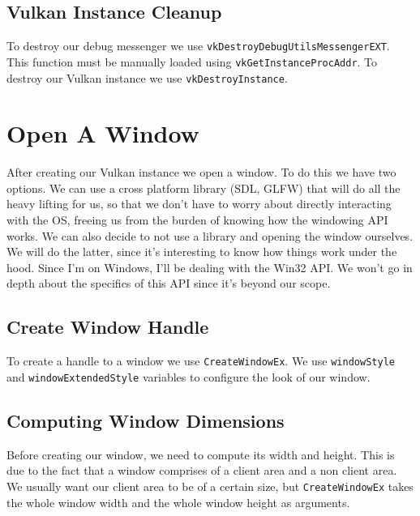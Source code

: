 \subsection{Vulkan Instance Cleanup}

To destroy our debug messenger we use \texttt{vkDestroyDebugUtilsMessengerEXT}.
This function must be manually loaded using \texttt{vkGetInstanceProcAddr}.
To destroy our Vulkan instance we use \texttt{vkDestroyInstance}.

\section{Open A Window}

After creating our Vulkan instance we open a window.
To do this we have two options.
We can use a cross platform library (SDL, GLFW) that will do all the heavy lifting
for us, so that we don't have to worry about directly interacting with the OS,
freeing us from the burden of knowing how the windowing API works.
We can also decide to not use a library and opening the window ourselves.
We will do the latter, since it's interesting to know how things work under the hood.
Since I'm on Windows, I'll be dealing with the Win32 API.
We won't go in depth about the specifics of this API since it's beyond our scope.

\subsection{Create Window Handle}

To create a handle to a window we use \texttt{CreateWindowEx}.
We use \texttt{windowStyle} and \texttt{windowExtendedStyle} variables to configure
the look of our window.

\begin{minipage}{\linewidth}{\noindent}
    
\end{minipage}

\subsection{Computing Window Dimensions}

Before creating our window, we need to compute its width and height.
This is due to the fact that a window comprises of a client area and a non client area.
We usually want our client area to be of a certain size, but \texttt{CreateWindowEx}
takes the whole window width and the whole window height as arguments.

